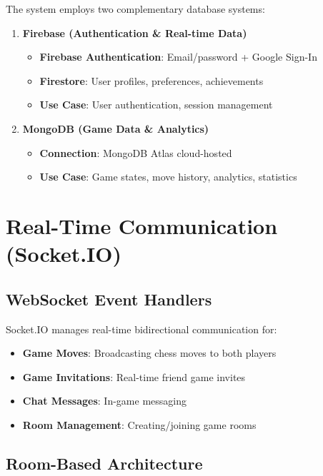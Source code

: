 The system employs two complementary database systems:

\begin{enumerate}
    \item \textbf{Firebase (Authentication \& Real-time Data)}
    \begin{itemize}
        \item \textbf{Firebase Authentication}: Email/password + Google Sign-In
        \item \textbf{Firestore}: User profiles, preferences, achievements
        \item \textbf{Use Case}: User authentication, session management
    \end{itemize}

    \item \textbf{MongoDB (Game Data \& Analytics)}
    \begin{itemize}
        \item \textbf{Connection}: MongoDB Atlas cloud-hosted
        \item \textbf{Use Case}: Game states, move history, analytics, statistics
    \end{itemize}
\end{enumerate}

\section{Real-Time Communication (Socket.IO)}

\subsection*{WebSocket Event Handlers}

Socket.IO manages real-time bidirectional communication for:

\begin{itemize}
    \item \textbf{Game Moves}: Broadcasting chess moves to both players
    \item \textbf{Game Invitations}: Real-time friend game invites
    \item \textbf{Chat Messages}: In-game messaging
    \item \textbf{Room Management}: Creating/joining game rooms
\end{itemize}

\subsection*{Room-Based Architecture}

